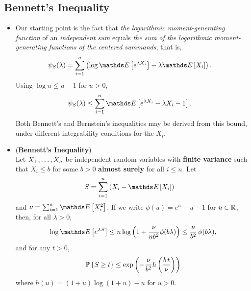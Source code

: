 \documentclass[11pt]{article}
\begin{document}
\subsection{Bennett's Inequality}
\begin{itemize}
\item \begin{remark}
Our starting point is the fact that  \emph{the logarithmic moment-generating function} of an \emph{independent sum} equals \emph{the sum of the logarithmic moment-generating functions of the centered summands}, that is,
\begin{align*}
\psi_{S}(\lambda) &=  \sum_{i=1}^{n}\paren{\log\E{}{e^{\lambda X_i}} - \lambda \E{}{X_i}}.
\end{align*}
Using $\log u \le u - 1$ for $u > 0$,
\begin{align}
\psi_{S}(\lambda) &\le \sum_{i=1}^{n}\E{}{e^{\lambda X_i} - \lambda X_i - 1}. \label{ineqn: log_mgf_bound}
\end{align}
Both Bennett's and Bernstein's inequalities may be derived from this bound, under different integrability conditions for the $X_i$.
\end{remark}

\item \begin{proposition} (\textbf{Bennett's Inequality}) \citep{boucheron2013concentration}\\
Let $X_1 \,{,}\ldots{,}\, X_n$ be independent random variables with \textbf{finite variance} such that $X_i \le b$ for some $b > 0$ \textbf{almost surely} for all $i \le n$. Let
\begin{align*}
S &= \sum_{i=1}^{n}\paren{X_i - \E{}{X_i}}
\end{align*} and $\nu = \sum_{i=1}^{n}\E{}{X_i^2}$. If we write $\phi(u) = e^u - u - 1$ for $u \in {\mathbb R}$, then, for all $\lambda > 0$,
\begin{align*}
\log \E{}{e^{\lambda S}} \le n \log\paren{1 + \frac{\nu}{n b^2}\phi(b \lambda)} \le \frac{\nu}{b^2}\,\phi(b\lambda),
\end{align*}
and for any $t > 0$,
\begin{align}
{\mathbb P}\left\{S \ge t\right\} \le \exp\left(-\frac{\nu}{b^2}h\left(\frac{b\,t}{\nu}\right)\right) \label{ineqn: bennett_inequality}
\end{align}
where $h(u) = (1 + u) \log(1 + u) - u$ for $u > 0$.
\end{proposition}

%


\end{itemize}
\end{document}
